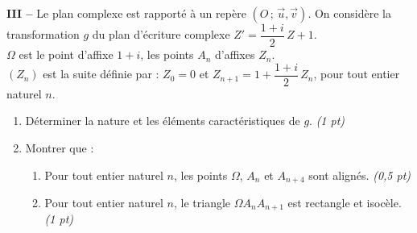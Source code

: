 \noindent\textbf{III -- } Le plan complexe est rapporté à un repère $(O\,;\,\vec u,\vec v)$. On considère la transformation $g$ du plan d'écriture complexe $Z'=\dfrac{1+i}{2}\,Z+1$.\\
$\Omega$ est le point d'affixe $1+i$, les points $A_n$ d'affixes $Z_n$.\\
$(Z_n)$ est la suite définie par : $Z_0=0$ et $Z_{n+1}=1+\dfrac{1+i}{2}\,Z_n$, pour tout entier naturel $n$.
\begin{enumerate}[label=\arabic*)]
\item Déterminer la nature et les éléments caractéristiques de $g$. \hfill\textit{(1 pt)}
\item Montrer que :
  \begin{enumerate}[label=\alph*)]
  \item Pour tout entier naturel $n$, les points $\Omega$, $A_n$ et $A_{n+4}$ sont alignés. \hfill\textit{(0,5 pt)}
  \item Pour tout entier naturel $n$, le triangle $\Omega A_n A_{n+1}$ est rectangle et isocèle. \hfill\textit{(1 pt)}
  \end{enumerate}
\end{enumerate}

